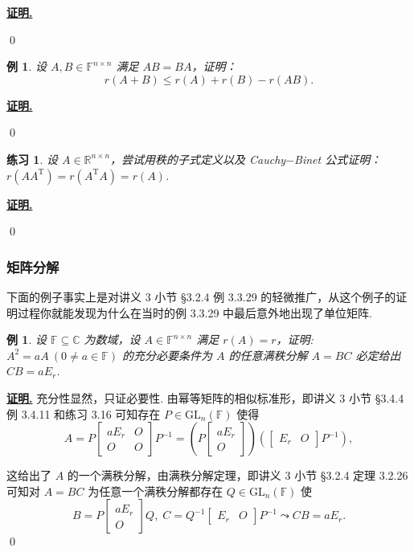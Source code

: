 \documentclass[10pt,openany]{article}
\theoremstyle{thmstyle} %
\newtheorem{practice}{练习}[section]
\theoremstyle{defstyle} %
\theoremstyle{prostyle} %
\theoremstyle{exastyle}
\newtheorem{example}[theorem]{例}
\theoremstyle{remstyle}
\renewenvironment{proof}[1][证明]{\par\underline{\textbf{#1.}} \;\fangsong}{\qed\par}
\newcommand{\T}{^{\text{T}}}
\newcommand{\F}{\mathbb{F}}
\newcommand{\gfn}{\text{GL}_n(\mathbb{F})}
\newcommand{\C}{\mathbb{C}}
\newcommand{\R}{\mathbb{R}}
\newcommand{\n}{^{n \times n}}
\begin{document}
\begin{proof}
	
\end{proof}

\begin{example}
	设 \( A,B \in \F\n \) 满足 \( AB=BA \)，证明：
	\[ r(A+B) \leq r(A)+r(B)-r(AB). \]
\end{example}

\begin{proof}
	
\end{proof}

\begin{practice}
	设 \( A \in \R\n \)，尝试用秩的子式定义以及 Cauchy\(-\)Binet 公式证明：\( r(AA\T)=r(A\T A)=r(A) \).
\end{practice}

\begin{proof}
	
\end{proof}

\subsubsection{矩阵分解}

下面的例子事实上是对讲义 3 小节 \S 3.2.4  例 3.3.29 的轻微推广，从这个例子的证明过程你就能发现为什么在当时的例 3.3.29 中最后意外地出现了单位矩阵.

\begin{example}
	设 \( \F \subseteq \C \) 为数域，设 \( A \in \F\n \) 满足 \( r(A)=r \)，证明: \( A^2=aA \ (0 \neq a \in \F) \) 的充分必要条件为 \( A \) 的任意满秩分解 \( A=BC \) 必定给出 \( CB=aE_r \).
\end{example}

\begin{proof}
   充分性显然，只证必要性. 由幂等矩阵的相似标准形，即讲义 3 小节 \S 3.4.4  例 3.4.11 和练习 3.16 可知存在 \( P \in \gfn \) 使得
   \[ A=P\begin{bmatrix}
   	aE_r & O \\
   	O & O
   \end{bmatrix}P^{-1}= \left( P \begin{bmatrix}
   aE_r \\ O
   \end{bmatrix}\right) \left( \begin{bmatrix}
   E_r & O
   \end{bmatrix}P^{-1} \right), \]
   
   这给出了 \( A \) 的一个满秩分解，由满秩分解定理，即讲义 3 小节 \S 3.2.4 定理 3.2.26 可知对 \( A=BC \) 为任意一个满秩分解都存在 \( Q \in \gfn \) 使
   \[ B=P \begin{bmatrix}
   	aE_r \\ O
   \end{bmatrix} Q, \; C=Q^{-1} \begin{bmatrix}
   E_r & O
   \end{bmatrix}P^{-1} \leadsto CB=aE_r. \]
\end{proof}
\end{document}
